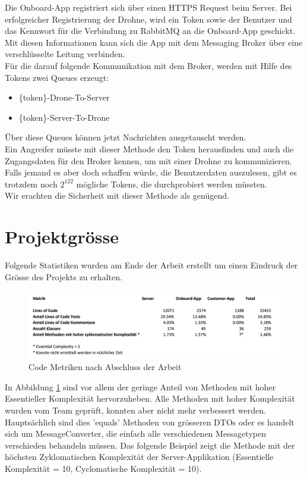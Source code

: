 Die Onboard-App registriert sich über einen HTTPS Request beim Server. Bei erfolgreicher Registrierung der Drohne, wird ein Token sowie der Benutzer und das Kennwort für die Verbindung zu RabbitMQ an die Onboard-App geschickt. Mit diesen Informationen kann sich die App mit dem Messaging Broker über eine verschlüsselte Leitung verbinden.\\

Für die darauf folgende Kommunikation mit dem Broker, werden mit Hilfe des Tokens zwei Queues erzeugt: 
\begin{itemize}
	\item \{token\}-Drone-To-Server
	\item  \{token\}-Server-To-Drone
\end{itemize}

Über diese Queues können jetzt Nachrichten ausgetauscht werden. \\

Ein Angreifer müsste mit dieser Methode den Token herausfinden und auch die Zugangsdaten für den Broker kennen, um mit einer Drohne zu kommunizieren. Falls jemand es aber doch schaffen würde, die Benutzerdaten auszulesen, gibt es trotzdem noch $2^{122}$ mögliche Tokens, die durchprobiert werden müssten. \\

Wir erachten die Sicherheit mit dieser Methode als genügend.

\section{Projektgrösse}

Folgende Statistiken wurden am Ende der Arbeit erstellt um einen Eindruck der Grösse des Projekts zu erhalten.\\

\begin{figure}[H]
	\centering
	\includegraphics[width=1.0\textwidth] {images/code-metrics.png}
	\caption{Code Metriken nach Abschluss der Arbeit}
	\label{fig:code-metrics}
\end{figure}

In Abbildung \ref{fig:code-metrics} sind vor allem der geringe Anteil von Methoden mit hoher Essentieller Komplexität hervorzuheben. Alle Methoden mit hoher Komplexität wurden vom Team geprüft, konnten aber nicht mehr verbessert werden. Hauptsächlich sind dies 'equals' Methoden von grösseren DTOs oder es handelt sich um MessageConverter, die einfach alle verschiedenen Messagetypen verschieden behandeln müssen. Das folgende Beispiel zeigt die Methode mit der höchsten Zyklomatischen Komplexität der Server-Applikation (Essentielle Komplexität = 10, Cyclomatische Komplexität = 10). \\


